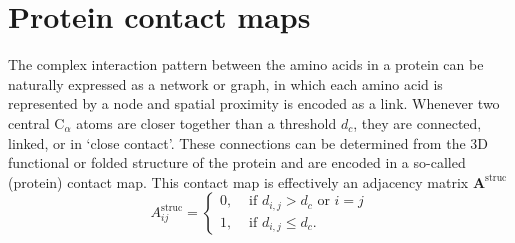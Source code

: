 \documentclass[
reprint,
twocolumn,
amsmath,amssymb,superscriptaddress,aps,
pre]{revtex4-1}
\begin{document}
\section{Protein contact maps}
\label{sec:methods}
The complex interaction pattern between the amino acids in a protein can be naturally expressed as a network or graph, in which each amino acid is represented by a node and spatial proximity is encoded as a link. Whenever two central $\mathrm{C}_\alpha$ atoms are closer together than a threshold $d_c$, they are connected, linked, or in `close contact'. These connections can be determined from the 3D functional or folded structure of the protein and are encoded in a so-called (protein) contact map. This contact map is effectively an adjacency matrix $\textbf{A}^{\mathrm{struc}}$ 
\begin{equation}
  A^{\mathrm{struc}}_{ij}=
  \begin{cases}
   0, & \text{ if } d_{i,j}>d_c \text{ or } i=j\\
      1, & \text{ if } d_{i,j}\leq d_c.
      \end{cases}
    \label{eq:aij}
\end{equation}
\end{document}
